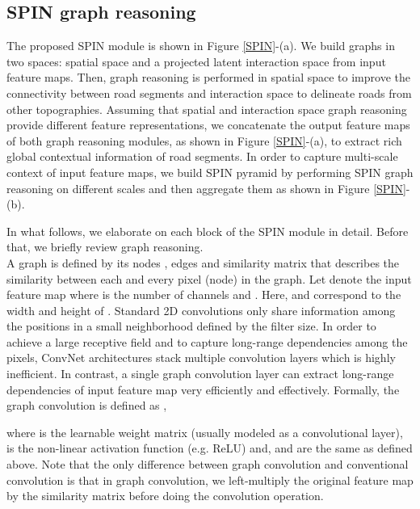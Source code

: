 \documentclass[letterpaper, 10 pt, conference]{ieeeconf}
\begin{document}
\subsection{SPIN graph reasoning}
The proposed SPIN module is shown in Figure \ref{SPIN}-(a). We build
graphs in two spaces: spatial space and a projected latent interaction space from input feature maps. Then, graph reasoning is performed in spatial space to improve the connectivity between road segments and interaction space to delineate roads from other topographies. Assuming that spatial and interaction space graph reasoning provide different feature representations, we concatenate the output feature maps of both graph reasoning modules, as shown in Figure \ref{SPIN}-(a), to extract rich global contextual information of road segments. In order to capture multi-scale context of input feature maps, we build SPIN pyramid by performing SPIN graph reasoning on different scales and then aggregate them  as shown in Figure \ref{SPIN}-(b). 

In what follows, we elaborate on each block of the SPIN module in detail.  Before that, we briefly review graph reasoning.\\
  A graph  is defined by its nodes , edges  and similarity matrix  that describes the similarity between each and every pixel (node) in the graph. Let  denote the input feature map where   is the number of channels and .  Here,  and  correspond to the width and height of . Standard 2D convolutions only share information among the positions in a small neighborhood defined by the filter size. In order to achieve a large receptive field and to capture long-range dependencies among the pixels, ConvNet architectures stack multiple convolution layers which is highly inefficient. In contrast, a single graph convolution layer can extract long-range dependencies of input feature map very efficiently and effectively. Formally, the graph convolution is defined as \cite{kipf2016semi},
\setlength{\belowdisplayskip}{0pt} \setlength{\belowdisplayshortskip}{0pt}
\setlength{\abovedisplayskip}{0pt} \setlength{\abovedisplayshortskip}{0pt}

where  is the learnable weight matrix (usually modeled as a convolutional layer),  is the non-linear activation function (e.g. ReLU) and,  and  are the same as defined above. Note that the only difference between graph convolution and conventional convolution is that in graph convolution, we left-multiply the original feature map   by the similarity matrix   before doing the convolution operation. 
\end{document}
